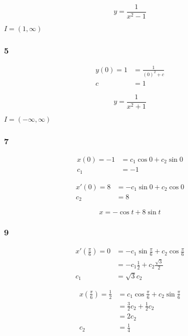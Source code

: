 \documentclass{article}
\begin{document}
\[y = \frac{1}{x^2 - 1}\]

$I = (1, \infty)$

\subsubsection{5}

\begin{align*}
  y(0) = 1 & = \frac{1}{(0)^2 + c} \\
  c        & = 1
\end{align*}

\[y = \frac{1}{x^2 + 1}\]

$I = (-\infty, \infty)$

\subsubsection{7}

\begin{align*}
  x(0) = -1 & = c_1 \cos 0 + c_2 \sin 0 \\
  c_1       & = -1
\end{align*}

\begin{align*}
  x'(0) = 8 & = -c_1 \sin 0 + c_2 \cos 0 \\
  c_2       & = 8
\end{align*}

\[x = -\cos t + 8 \sin t\]

\subsubsection{9}

\begin{align*}
  x' \left( \frac{\pi}{6} \right) = 0 & = -c_1 \sin \frac{\pi}{6} + c_2 \cos \frac{\pi}{6} \\
                                      & = -c_1 \frac{1}{2} + c_2 \frac{\sqrt{3}}{2}        \\
  c_1                                 & = \sqrt{3} c_2
\end{align*}

\begin{align*}
  x \left( \frac{\pi}{6} \right) = \frac{1}{2} & = c_1 \cos \frac{\pi}{6} + c_2 \sin \frac{\pi}{6} \\
                                               & = \frac{3}{2} c_2 + \frac{1}{2} c_2               \\
                                               & = 2 c_2                                           \\
  c_2                                          & = \frac{1}{4}
\end{align*}
\end{document}

